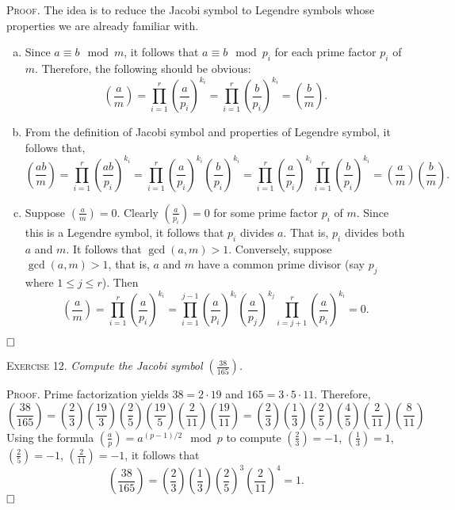\documentclass[11pt, leqno]{article}
\newcommand{\done}{\ensuremath{\hfill\square}}
\begin{document}
\textsc{Proof}. The idea is to reduce the Jacobi symbol to Legendre symbols whose properties we are already familiar with.
\begin{enumerate}[(a)]
\item Since $a\equiv b \mod m$, it follows that $a \equiv b \mod p_i$ for each prime factor $p_i$ of $m$. Therefore, the following should be obvious: 
\begin{displaymath}
\left( \frac{a}{m} \right) = \prod_{i=1}^r \left( \frac{a}{p_i} \right)^{k_i} = \prod_{i=1}^r \left( \frac{b}{p_i} \right)^{k_i} = \left( \frac{b}{m} \right).
\end{displaymath} 
\item From the definition of Jacobi symbol and properties of Legendre symbol, it follows that, 
\begin{displaymath}
\left( \frac{ab}{m} \right) = \prod_{i=1}^r \left( \frac{ab}{p_i} \right)^{k_i} = \prod_{i=1}^r \left( \frac{a}{p_i} \right)^{k_i} \left( \frac{b}{p_i} \right)^{k_i} = \prod_{i=1}^r \left( \frac{a}{p_i} \right)^{k_i} \prod_{i=1}^r \left( \frac{b}{p_i} \right)^{k_i} = \left( \frac{a}{m} \right) \left( \frac{b}{m} \right).
\end{displaymath} 
\item Suppose $\left( \frac{a}{m} \right) = 0$. Clearly $\left( \frac{a}{p_i} \right) = 0$ for some prime factor $p_i$ of $m$. Since this is a Legendre symbol, it follows that $p_i$ divides $a$. That is, $p_i$ divides both $a$ and $m$. It follows that $\gcd(a,m)>1$. Conversely, suppose $\gcd(a,m)>1$, that is, $a$ and $m$ have a common prime divisor (say $p_j$ where $1\leq j \leq r$). Then 
\begin{displaymath}
\left( \frac{a}{m} \right) = \prod_{i=1}^r \left( \frac{a}{p_i} \right)^{k_i} = \prod_{i=1}^{j-1} \left( \frac{a}{p_i} \right)^{k_i} \left( \frac{a}{p_j} \right)^{k_j} \prod_{i=j+1}^r \left( \frac{a}{p_i} \right)^{k_i} = 0.
\end{displaymath}
\end{enumerate}\done

\textsc{Exercise 12}. \emph{Compute the Jacobi symbol $\left( \frac{38}{165} \right)$.}

\textsc{Proof}. Prime factorization yields $38 = 2 \cdot 19$ and $165 = 3 \cdot 5 \cdot 11$. Therefore, 
\begin{displaymath}
\left( \frac{38}{165} \right) = \left( \frac{2}{3} \right) \left( \frac{19}{3} \right) \left( \frac{2}{5} \right) \left( \frac{19}{5} \right) \left( \frac{2}{11} \right) \left( \frac{19}{11} \right) = \left( \frac{2}{3} \right) \left( \frac{1}{3} \right) \left( \frac{2}{5} \right) \left( \frac{4}{5} \right) \left( \frac{2}{11} \right) \left( \frac{8}{11} \right)
\end{displaymath}
Using the formula $\left( \frac{a}{p} \right) = a^{(p-1)/2} \mod p$ to compute $\left( \frac{2}{3} \right) = -1$, $\left( \frac{1}{3} \right) = 1$, $\left( \frac{2}{5} \right) = -1$, $\left( \frac{2}{11} \right) = -1$, it follows that 
\begin{displaymath}
\left( \frac{38}{165} \right) = \left( \frac{2}{3} \right) \left( \frac{1}{3} \right) \left( \frac{2}{5} \right)^3 \left( \frac{2}{11} \right)^4 = 1.
\end{displaymath}
\done
\end{document}
